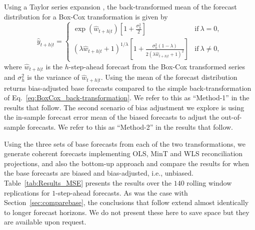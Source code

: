 \documentclass[12pt]{article}
\theoremstyle{definition}
\begin{document}
Using a Taylor series expansion \citep{guerrero1993time}, the back-transformed mean of the forecast distribution for a Box-Cox transformation is given by
\begin{equation}\label{eq:BoxCox_BT_biasadj}
  \hat{y}_{t+h|t} =
    \begin{cases}
      \exp(\hat{w}_{t+h|t})\left[1+\frac{\sigma_h^2}{2}\right] & \text{if}~\lambda = 0, \\
      (\lambda \hat{w}_{t+h|t} + 1)^{1/\lambda}
        \left[1 + \frac{\sigma_h^2(1-\lambda)}{2(\lambda \hat{w}_{t+h|t} + 1)^2}\right]
                                                      & \text{if}~\lambda \ne 0,
\end{cases}
\end{equation}
where $\hat{w}_{t+h|t}$ is the $h$-step-ahead forecast from the Box-Cox transformed series and $\sigma_h^2$ is the variance of $\hat{w}_{t+h|t}$. Using the mean of the forecast distribution returns bias-adjusted base forecasts compared to the simple back-transformation of Eq.~\eqref{eq:BoxCox_back-transformation}. We refer to this as ``Method-1'' in the results that follow. The second scenario of bias adjustment we explore is using the in-sample forecast error mean of the biased forecasts to adjust the out-of-sample forecasts. We refer to this as ``Method-2'' in the results that follow.

Using the three sets of base forecasts from each of the two transformations, we generate coherent forecasts implementing OLS, MinT and WLS reconciliation projections, and also the bottom-up approach and compare the results for when the base forecasts are biased and bias-adjusted, i.e., unbiased. Table~\ref{tab:Results_MSE} presents the results over the $140$ rolling window replications for $1$-step-ahead forecasts. As was the case with Section~\ref{sec:comparebase}, the conclusions that follow extend almost identically to longer forecast horizons. We do not present these here to save space but they are available upon request.
\end{document}
